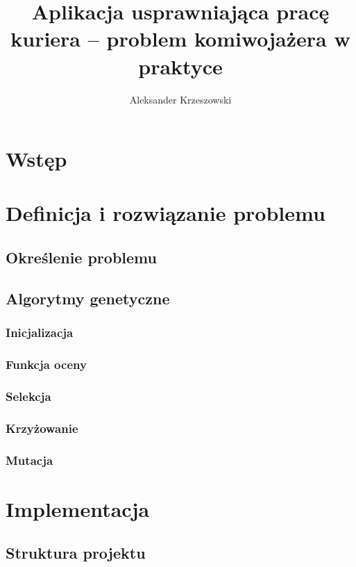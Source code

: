\documentclass[12pt,a4paper]{report}
\begin{document}
	\author{Aleksander Krzeszowski}
	\title{Aplikacja usprawniająca pracę kuriera -- problem komiwojażera w praktyce}
	
	
		
	\tableofcontents
	\chapter*{Wstęp}
		
	\chapter{Definicja i rozwiązanie problemu}
		\label{ch:definicja_i_rozwiazanie}
		\section{Określenie problemu}
			
		\section{Algorytmy genetyczne}
			
		\subsection{Inicjalizacja}
			
		\subsection{Funkcja oceny}
			
		\subsection{Selekcja}
			
		\subsection{Krzyżowanie}
			
		\subsection{Mutacja}
			
	\chapter{Implementacja}
		\section{Struktura projektu}
			
\end{document}
